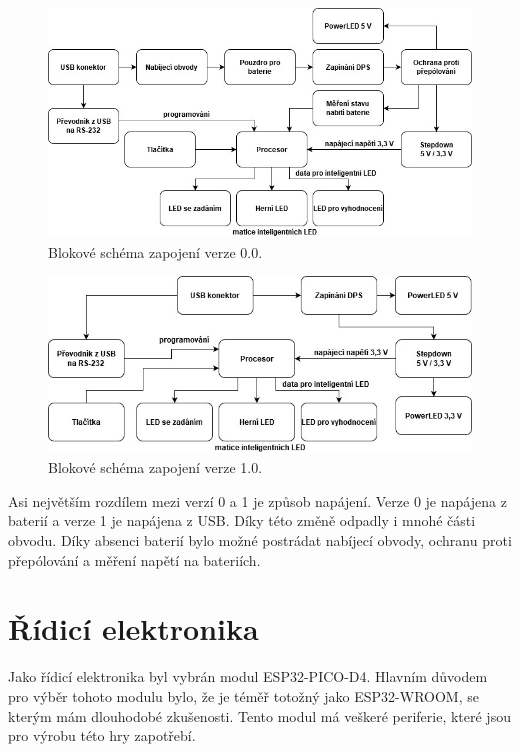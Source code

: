 \begin{figure}[!h]
  \begin{center}
    \includegraphics[scale=0.5]{obrazky/v0_blokove_schema.jpg}
  \end{center}
  \caption[Blokové schéma zapojení verze 0.0]{Blokové schéma zapojení verze 0.0.}
\end{figure}

\begin{figure}[!h]
  \begin{center}
    \includegraphics[scale=0.5]{obrazky/v1_blokove_schema.jpg}
  \end{center}
  \caption[Blokové schéma zapojení verze 1.0]{Blokové schéma zapojení verze 1.0.}
\end{figure}

Asi největším rozdílem mezi verzí 0 a 1 je způsob napájení. Verze 0 je napájena z baterií a verze 1 je napájena z USB. Díky této změně 
odpadly i mnohé části obvodu. Díky absenci baterií bylo možné postrádat nabíjecí obvody, ochranu proti přepólování a měření napětí 
na bateriích.

\section{Řídicí elektronika}
Jako řídicí elektronika byl vybrán modul ESP32-PICO-D4. Hlavním důvodem pro výběr tohoto modulu bylo, že je téměř totožný jako ESP32-WROOM, se 
kterým mám dlouhodobé zkušenosti. Tento modul má veškeré periferie, které jsou pro výrobu této hry zapotřebí. 

